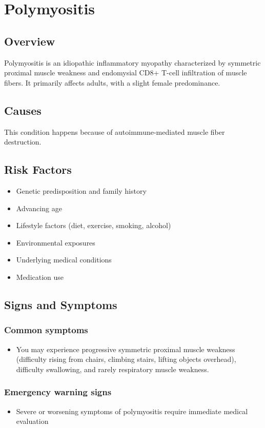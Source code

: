 \chapter{Polymyositis}
\label{sec:Polymyositis}

\section{Overview}
Polymyositis is an idiopathic inflammatory myopathy characterized by symmetric proximal muscle weakness and endomysial CD8+ T-cell infiltration of muscle fibers. It primarily affects adults, with a slight female predominance.
\section{Causes}
This condition happens because of autoimmune-mediated muscle fiber destruction.     
\section{Risk Factors}

\begin{itemize}[noitemsep]
  \item Genetic predisposition and family history
  \item Advancing age
  \item Lifestyle factors (diet, exercise, smoking, alcohol)
  \item Environmental exposures
  \item Underlying medical conditions
  \item Medication use
\end{itemize}
\section{Signs and Symptoms}

\subsection{Common symptoms}
\begin{itemize}[noitemsep]
  \item You may experience progressive symmetric proximal muscle weakness (difficulty rising from chairs, climbing stairs, lifting objects overhead), difficulty swallowing, and rarely respiratory muscle weakness. 
  \end{itemize}

\subsection{Emergency warning signs}
\begin{itemize}[noitemsep]
  \item Severe or worsening symptoms of polymyositis require immediate medical evaluation
\end{itemize}
